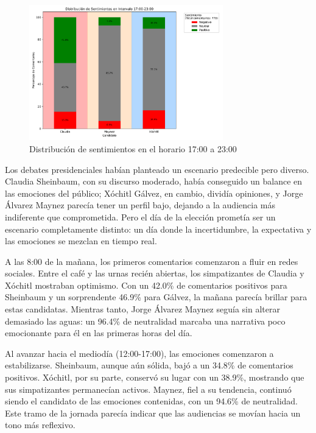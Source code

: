 \documentclass[10pt, a4paper]{article}
\begin{document}
	\begin{figure}[h!] %
		\centering
		\includegraphics[width=0.75\textwidth]{sA_intervalo_1723.pdf} %
		\caption{Distribución de sentimientos en el horario 17:00 a 23:00} %
		\label{fig:sA_17a23} %
	\end{figure}
	
	
	Los debates presidenciales habían planteado un escenario predecible pero diverso. Claudia Sheinbaum, con su discurso moderado, había conseguido un balance en las emociones del público; Xóchitl Gálvez, en cambio, dividía opiniones, y Jorge Álvarez Maynez parecía tener un perfil bajo, dejando a la audiencia más indiferente que comprometida. Pero el día de la elección prometía ser un escenario completamente distinto: un día donde la incertidumbre, la expectativa y las emociones se mezclan en tiempo real.
	
	A las 8:00 de la mañana, los primeros comentarios comenzaron a fluir en redes sociales. Entre el café y las urnas recién abiertas, los simpatizantes de Claudia y Xóchitl mostraban optimismo. Con un 42.0\% de comentarios positivos para Sheinbaum y un sorprendente 46.9\% para Gálvez, la mañana parecía brillar para estas candidatas. Mientras tanto, Jorge Álvarez Maynez seguía sin alterar demasiado las aguas: un 96.4\% de neutralidad marcaba una narrativa poco emocionante para él en las primeras horas del día.
	
	Al avanzar hacia el mediodía (12:00-17:00), las emociones comenzaron a estabilizarse. Sheinbaum, aunque aún sólida, bajó a un 34.8\% de comentarios positivos. Xóchitl, por su parte, conservó su lugar con un 38.9\%, mostrando que sus simpatizantes permanecían activos. Maynez, fiel a su tendencia, continuó siendo el candidato de las emociones contenidas, con un 94.6\% de neutralidad. Este tramo de la jornada parecía indicar que las audiencias se movían hacia un tono más reflexivo.
	
\end{document}

